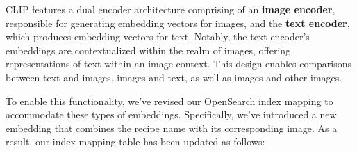 \documentclass[runningheads]{llncs}
\begin{document}
CLIP features a dual encoder architecture comprising of an \textbf{image encoder}, responsible for generating embedding vectors for images, and the \textbf{text encoder}, which produces embedding vectors for text. Notably, the text encoder's embeddings are contextualized within the realm of images, offering representations of text within an image context. This design enables comparisons between text and images, images and text, as well as images and other images.

To enable this functionality, we've revised our OpenSearch index mapping to accommodate these types of embeddings. Specifically, we've introduced a new embedding that combines the recipe name with its corresponding image. As a result, our index mapping table has been updated as follows:

\begin{table}[ht]
\centering
\setlength{\abovecaptionskip}{10pt} %
\caption{Updated Index Mapping}
\label{tab:mappings}
\end{table}
\end{document}
